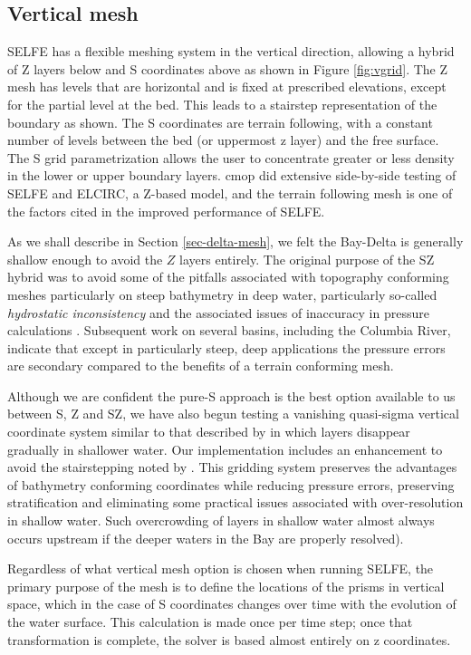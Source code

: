 \subsection{Vertical mesh}
SELFE has a flexible meshing system in the vertical direction, allowing a hybrid
of Z layers below and S coordinates above as shown in Figure \ref{fig:vgrid}. 
The Z mesh has levels that are horizontal and is fixed 
at prescribed elevations, except for the partial level at the bed. This leads to 
a stairstep representation of the boundary as shown. The S coordinates \citep{Song94} are 
terrain following, with a constant number of levels between the bed (or uppermost z layer) and the free surface. 
The S grid parametrization allows the user to concentrate greater or less
density in the lower or upper boundary layers.  \gls{cmop} did extensive side-by-side 
testing of SELFE and ELCIRC, a Z-based model, and the terrain following mesh is one of the factors cited in the improved performance of SELFE.

As we shall describe in Section \ref{sec-delta-mesh}, we felt the Bay-Delta is generally shallow 
enough to avoid the $Z$ layers entirely.
The original purpose of the SZ hybrid was to avoid some of the pitfalls associated with topography conforming
meshes particularly on steep bathymetry in deep water, particularly so-called {\em hydrostatic inconsistency} and
the associated issues of inaccuracy in pressure calculations \citep{Shchepetkin05,Haney91}. Subsequent work on several basins, including the Columbia River, indicate that except in particularly steep, deep applications the pressure errors are secondary compared to the benefits of a terrain conforming mesh.

Although we are confident the pure-S approach is the best option available to us between S, Z and SZ,
we have also begun testing a vanishing quasi-sigma vertical coordinate system similar to that described by
\cite{Dukhovskoy09} in which layers disappear gradually in shallower water. Our implementation includes an
enhancement to avoid the stairstepping noted by  \cite{Dukhovskoy09}. This gridding system preserves the advantages
of bathymetry conforming coordinates while reducing pressure errors,
preserving stratification and eliminating some practical issues associated with 
over-resolution in shallow water. Such overcrowding of layers in shallow water almost always
occurs upstream if the deeper waters in the Bay are properly resolved).

Regardless of what vertical mesh option is chosen when running SELFE, the primary purpose of the mesh is to define the 
locations of the prisms in vertical space, which in the case of S coordinates changes over time with the evolution of
the water surface. This calculation is made once per time step; once that transformation is complete, the 
solver is based almost entirely on z coordinates.

